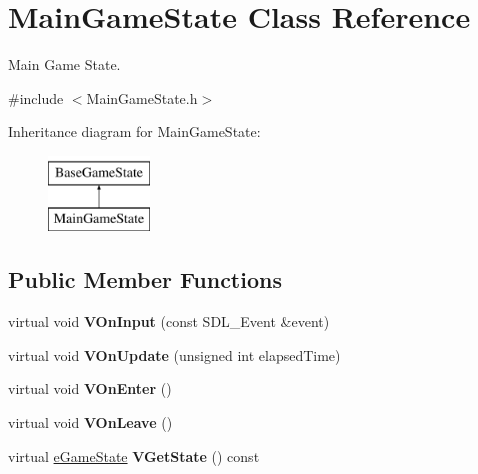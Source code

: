 \hypertarget{classMainGameState}{\section{Main\-Game\-State Class Reference}
\label{classMainGameState}
}


Main Game State.  




{\ttfamily \#include $<$Main\-Game\-State.\-h$>$}

Inheritance diagram for Main\-Game\-State\-:\begin{figure}[H]
\begin{center}
\leavevmode
\includegraphics[height=2.000000cm]{classMainGameState}
\end{center}
\end{figure}
\subsection*{Public Member Functions}
\begin{DoxyCompactItemize}
\item 
\hypertarget{classMainGameState_aa932d13b9b41a05cbbc05b45eef98ae4}{virtual void {\bfseries V\-On\-Input} (const S\-D\-L\-\_\-\-Event \&event)}\label{classMainGameState_aa932d13b9b41a05cbbc05b45eef98ae4}

\item 
\hypertarget{classMainGameState_a6374f0cb1192715bca585315af1976b3}{virtual void {\bfseries V\-On\-Update} (unsigned int elapsed\-Time)}\label{classMainGameState_a6374f0cb1192715bca585315af1976b3}

\item 
\hypertarget{classMainGameState_a5780e3021b8dfa3b8f931a0018390952}{virtual void {\bfseries V\-On\-Enter} ()}\label{classMainGameState_a5780e3021b8dfa3b8f931a0018390952}

\item 
\hypertarget{classMainGameState_a46ba76a3567d1a30ca672460fa9912fd}{virtual void {\bfseries V\-On\-Leave} ()}\label{classMainGameState_a46ba76a3567d1a30ca672460fa9912fd}

\item 
\hypertarget{classMainGameState_a593b08a034c2bdc9ecedfc46ca461f1a}{virtual \hyperlink{BaseGameState_8h_ae12dcfc1b1e01980b11e116e3af6807f}{e\-Game\-State} {\bfseries V\-Get\-State} () const }\label{classMainGameState_a593b08a034c2bdc9ecedfc46ca461f1a}

\end{DoxyCompactItemize}
